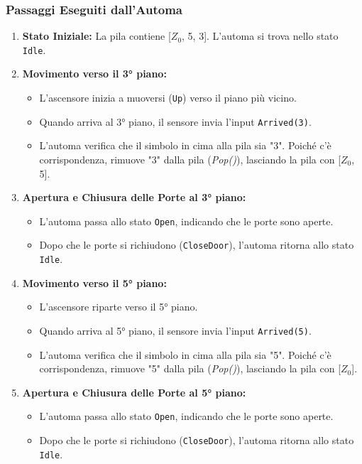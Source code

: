 \documentclass[a4paper,12pt]{report}
\begin{document}
\subsubsection*{Passaggi Eseguiti dall'Automa}
\begin{enumerate}
    \item \textbf{Stato Iniziale:} La pila contiene [$Z_0$, 5, 3]. L'automa si trova nello stato \texttt{Idle}.
    \item \textbf{Movimento verso il 3° piano:}
        \begin{itemize}
            \item L'ascensore inizia a muoversi (\texttt{Up}) verso il piano più vicino.
            \item Quando arriva al 3° piano, il sensore invia l'input \texttt{Arrived(3)}.
            \item L'automa verifica che il simbolo in cima alla pila sia "3". Poiché c'è corrispondenza, rimuove "3" dalla pila (\textit{Pop()}), lasciando la pila con [$Z_0$, 5].
        \end{itemize}
    \item \textbf{Apertura e Chiusura delle Porte al 3° piano:}
        \begin{itemize}
            \item L'automa passa allo stato \texttt{Open}, indicando che le porte sono aperte.
            \item Dopo che le porte si richiudono (\texttt{CloseDoor}), l'automa ritorna allo stato \texttt{Idle}.
        \end{itemize}
    \item \textbf{Movimento verso il 5° piano:}
        \begin{itemize}
            \item L'ascensore riparte verso il 5° piano.
            \item Quando arriva al 5° piano, il sensore invia l'input \texttt{Arrived(5)}.
            \item L'automa verifica che il simbolo in cima alla pila sia "5". Poiché c'è corrispondenza, rimuove "5" dalla pila (\textit{Pop()}), lasciando la pila con [$Z_0$].
        \end{itemize}
    \item \textbf{Apertura e Chiusura delle Porte al 5° piano:}
        \begin{itemize}
            \item L'automa passa allo stato \texttt{Open}, indicando che le porte sono aperte.
            \item Dopo che le porte si richiudono (\texttt{CloseDoor}), l'automa ritorna allo stato \texttt{Idle}.
        \end{itemize}
\end{enumerate}
\end{document}
